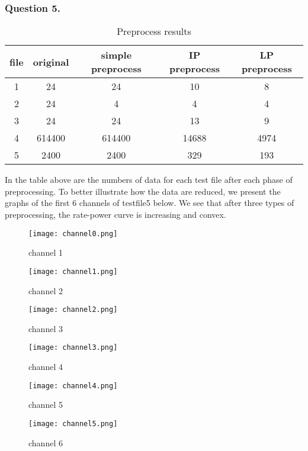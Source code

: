 \documentclass[11pt, oneside]{report}
\begin{document}
\subsubsection{Question 5.}

\begin{table}[!htbp]
\centering
\begin{tabular}{|c|c|c|c|c|}%
\hline
file & original & simple preprocess & IP preprocess & LP preprocess  \\
\hline
1 & 24 & 24 & 10 & 8\\
\hline
2 & 24 & 4 & 4 & 4\\
\hline
3 & 24 & 24 & 13 & 9\\
\hline
4 & 614400 & 614400 & 14688 & 4974\\
\hline
5 & 2400 & 2400 & 329 & 193\\
\hline
\end{tabular}
\caption{Preprocess results}
\end{table}

In the table above are the numbers of data for each test file after each phase of preprocessing. To better illustrate how the data are reduced, we present the graphs of the first 6 channels of testfile5 below. We see that after three types of preprocessing, the rate-power curve is increasing and convex.  

\begin{figure}[htbp]
\centering
\begin{minipage}[t]{0.48\textwidth}
\centering
\texttt{[image: channel0.png]}
\caption{channel 1}
\end{minipage}
\begin{minipage}[t]{0.48\textwidth}
\centering
\texttt{[image: channel1.png]}
\caption{channel 2}
\end{minipage}
\centering
\begin{minipage}[t]{0.48\textwidth}
\centering
\texttt{[image: channel2.png]}
\caption{channel 3}
\end{minipage}
\begin{minipage}[t]{0.48\textwidth}
\centering
\texttt{[image: channel3.png]}
\caption{channel 4}
\end{minipage}
\centering
\begin{minipage}[t]{0.48\textwidth}
\centering
\texttt{[image: channel4.png]}
\caption{channel 5}
\end{minipage}
\begin{minipage}[t]{0.48\textwidth}
\centering
\texttt{[image: channel5.png]}
\caption{channel 6}
\end{minipage}
\end{figure}
\end{document}

